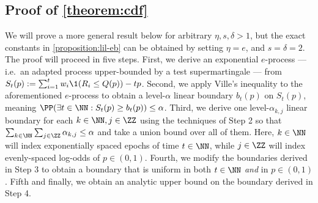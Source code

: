 \subsection{Proof of \cref{theorem:cdf}}\label{proof:cdf}





We will prove a more general result below for arbitrary $\eta, s, \delta > 1$, but the exact constants in \cref{proposition:lil-eb} can be obtained by setting $\eta = e$, and $s = \delta = 2$.
The proof will proceed in five steps. First, we derive an exponential $e$-process --- i.e.~an adapted process upper-bounded by a test supermartingale --- from $S_t(p) := \sum_{i=1}^t w_i \1(R_i \leq Q(p)) - tp$. Second, we apply Ville's inequality to the aforementioned $e$-process to obtain a level-$\alpha$ linear boundary $b_t(p)$ on $S_t(p)$, meaning $\PP(\exists t \in \NN : S_t(p) \geq b_t(p)) \leq \alpha$. Third, we derive one level-$\alpha_{k,j}$ linear boundary for each $k \in \NN, j \in \ZZ$ using the techniques of Step 2 so that $\sum_{k\in\NN}\sum_{j \in \ZZ} \alpha_{k,j} \leq \alpha$ and take a union bound over all of them. Here, $k \in \NN$ will index exponentially spaced epochs of time $t \in \NN$, while $j \in \ZZ$ will index evenly-spaced log-odds of $p \in (0, 1)$. Fourth, we modify the boundaries derived in Step 3 to obtain a boundary that is uniform in both $t \in \NN$ \emph{and} in $p \in (0, 1)$. Fifth and finally, we obtain an analytic upper bound on the boundary derived in Step 4.

